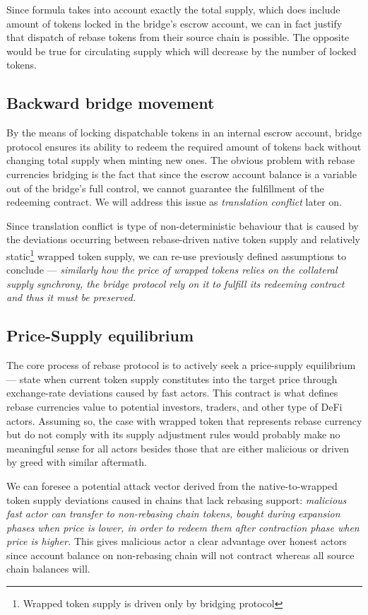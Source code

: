 \documentclass{article}
\begin{document}
Since formula takes into account exactly the total supply, which does include amount of tokens locked in the bridge's escrow account, we can in fact justify that dispatch of rebase tokens from their source chain is possible. The opposite would be true for circulating supply which will decrease by the number of locked tokens.

\subsection{Backward bridge movement}

By the means of locking dispatchable tokens in an internal escrow account, bridge protocol ensures its ability to redeem the required amount of tokens back without changing total supply when minting new ones. The obvious problem with rebase currencies bridging is the fact that since the escrow account balance is a variable out of the bridge's full control, we cannot guarantee the fulfillment of the redeeming contract. We will address this issue as \textit{translation conflict} later on.

Since translation conflict is type of non-deterministic behaviour that is caused by the deviations occurring between rebase-driven native token supply and relatively static\footnote{Wrapped token supply is driven only by bridging protocol} wrapped token supply, we can re-use previously defined assumptions to conclude --- \textit{similarly how the price of wrapped tokens relies on the collateral supply synchrony, the bridge protocol rely on it to fulfill its redeeming contract and thus it must be preserved.}

\subsection{Price-Supply equilibrium}

The core process of rebase protocol is to actively seek a price-supply equilibrium --- state when current token supply constitutes into the target price through exchange-rate deviations caused by fast actors. This contract is what defines rebase currencies value to potential investors, traders, and other type of DeFi actors. Assuming so, the case with wrapped token that represents rebase currency but do not comply with its supply adjustment rules would probably make no meaningful sense for all actors besides those that are either malicious or driven by greed with similar aftermath.

We can foresee a potential attack vector derived from the native-to-wrapped token supply deviations caused in chains that lack rebasing support: \textit{malicious fast actor can transfer to non-rebasing chain tokens, bought during expansion phases when price is lower, in order to redeem them after contraction phase when price is higher.} This gives malicious actor a clear advantage over honest actors since account balance on non-rebasing chain will not contract whereas all source chain balances will.
\end{document}
